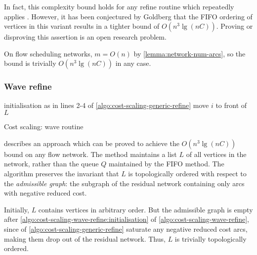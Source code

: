 \begin{remark}
In fact, this complexity bound holds for any refine routine which repeatedly applies . However, it has been conjectured by Goldberg that the FIFO ordering of vertices in this variant results in a tighter bound of $O(n^3 \lg (nC))$. Proving or disproving this assertion is an open research problem.\\
\end{remark} 

\begin{remark}
On flow scheduling networks, $m = O(n)$ by \cref{lemma:network-num-arcs}, so the bound is trivially $O(n^3 \lg (nC))$ in any case.
\end{remark}

\subsubsection{Wave refine}

\begin{algorithm}
\begin{algorithmic}[1]
    \State initialisation as in lines 2-4 of \label{algo:cost-scaling-wave-refine:initialisation} \cref{algo:cost-scaling-generic-refine}
     
    \Repeat
                \State {}
                    \State move $i$ to front of $L$
                \EndIf
            \EndIf
        \EndFor
    \EndFunction
\end{algorithmic}
\caption{Cost scaling: wave  routine}
\label{algo:cost-scaling-wave-refine}
\end{algorithm}

 describes an approach which can be proved to achieve the $O(n^3 \lg (nC))$ bound on any flow network. The method maintains a list $L$ of all vertices in the network, rather than the queue $Q$ maintained by the FIFO method. The algorithm preserves the invariant that $L$ is topologically ordered with respect to the \emph{admissible graph}: the subgraph of the residual network containing only arcs with negative reduced cost.

Initially, $L$ contains vertices in arbitrary order. But the admissible graph is empty after \cref{algo:cost-scaling-wave-refine:initialisation} of \cref{algo:cost-scaling-wave-refine}, since  of \cref{algo:cost-scaling-generic-refine} saturate any negative reduced cost arcs, making them drop out of the residual network. Thus, $L$ is trivially topologically ordered.

